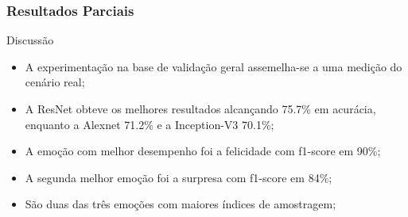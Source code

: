 \documentclass{beamer}
\begin{document}
\begin{frame}
\frametitle{Resultados Parciais}
 \begin{block}{Discussão}
\begin{itemize}
\item A experimentação na base de validação geral assemelha-se a uma medição do cenário real;
\item A ResNet obteve os melhores resultados alcançando 75.7\% em acurácia, enquanto a Alexnet 71.2\% e a Inception-V3 70.1\%;
\item A emoção com melhor desempenho foi a felicidade com f1-score em 90\%;
\item A segunda melhor emoção foi a surpresa com f1-score em 84\%;
\pause
\item São duas das três emoções com maiores índices de amostragem;
\end{itemize}
\end{block}
\end{frame}
\end{document}
